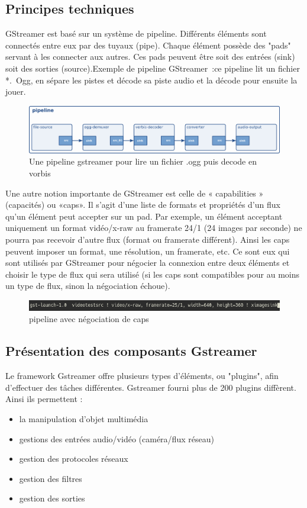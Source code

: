 \subsection{Principes techniques}
\label{principe_gst}
GStreamer est basé sur un système de pipeline. Différents éléments sont connectés entre eux par des tuyaux (pipe). Chaque élément possède des "pads" servant à les connecter aux autres. Ces pads peuvent être soit des entrées (sink) soit des sorties (source).Exemple de pipeline GStreamer :ce pipeline lit un fichier *. Ogg, en sépare les pistes et décode sa piste audio et la décode pour ensuite la jouer.
\begin{figure}[!h]
  \centering
  \includegraphics[scale=0.5]{figures/pipeline_ogg}
  \caption{Une pipeline gstreamer pour lire un fichier .ogg puis decode en vorbis}
\end{figure}

Une autre notion importante de GStreamer est celle de « capabilities » (capacités) ou «caps». Il s'agit d'une liste de formats et propriétés d’un flux qu'un élément peut accepter sur un pad. Par exemple, un élément acceptant uniquement un format vidéo/x-raw au framerate 24/1 (24 images par seconde) ne pourra pas recevoir d'autre flux (format ou framerate différent). Ainsi les caps peuvent imposer un format, une résolution, un framerate, etc. Ce sont eux qui sont utilisés par GStreamer pour négocier la connexion entre deux éléments et choisir le type de flux qui sera utilisé (si les caps sont compatibles pour au moins un type de flux, sinon la négociation échoue).

\begin{figure}[!h]
  \centering
  \includegraphics[scale=0.9]{figures/caps_negociation}
  \caption{pipeline avec négociation de caps}
\end{figure}

\subsection{Présentation des composants Gstreamer}
Le framework Gstreamer offre plusieurs types d'éléments, ou "plugins", afin d'effectuer des tâches différentes. Gstreamer fourni plus de 200 plugins diffèrent. Ainsi ils permettent :\begin{itemize}[label=$\bullet$]
 \item la manipulation d’objet multimédia
 \item gestions des entrées audio/vidéo (caméra/flux réseau)
 \item gestion des protocoles réseaux
 \item gestion des filtres
 \item gestion des sorties
\end{itemize}

